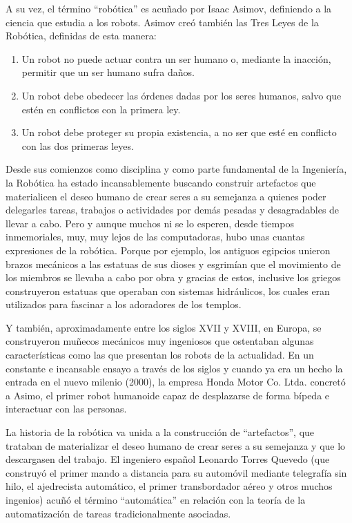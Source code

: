 A su vez, el término ``robótica'' es acuñado por Isaac Asimov, definiendo a la ciencia que estudia a los robots. Asimov creó también las Tres Leyes de la Robótica, definidas de esta manera:

\begin{enumerate}
	\itemsep1pt \parskip1pt 
	\item Un robot no puede actuar contra un ser humano o, mediante la inacción, permitir que un ser humano sufra daños.
	\item Un robot debe obedecer las órdenes dadas por los seres humanos, salvo que estén en conflictos con la primera ley.
	\item Un robot debe proteger su propia existencia, a no ser que esté en conflicto con las dos primeras leyes.
\end{enumerate}

Desde sus comienzos como disciplina y como parte fundamental de la Ingeniería, la Robótica ha estado incansablemente buscando construir artefactos que materialicen el deseo humano de crear seres a su semejanza a quienes poder delegarles tareas, trabajos o actividades por demás pesadas y desagradables de llevar a cabo. Pero y aunque muchos ni se lo esperen, desde tiempos inmemoriales, muy, muy lejos de las computadoras, hubo unas cuantas expresiones de la robótica. Porque por ejemplo, los antiguos egipcios unieron brazos mecánicos a las estatuas de sus dioses y esgrimían que el movimiento de los miembros se llevaba a cabo por obra y gracias de estos, inclusive los griegos construyeron estatuas que operaban con sistemas hidráulicos, los cuales eran utilizados para fascinar a los adoradores de los templos.

Y también, aproximadamente entre los siglos XVII y XVIII, en Europa, se construyeron muñecos mecánicos muy ingeniosos que ostentaban algunas características como las que presentan los robots de la actualidad. En un constante e incansable ensayo a través de los siglos y cuando ya era un hecho la entrada en el nuevo milenio (2000), la empresa Honda Motor Co. Ltda. concretó a Asimo, el primer robot humanoide capaz de desplazarse de forma bípeda e interactuar con las personas.

La historia de la robótica va unida a la construcción de ``artefactos'', que trataban de materializar el deseo humano de crear seres a su semejanza y que lo descargasen del trabajo. El ingeniero español Leonardo Torres Quevedo (que construyó el primer mando a distancia para su automóvil mediante telegrafía sin hilo, el ajedrecista automático, el primer transbordador aéreo y otros muchos ingenios) acuñó el término ``automática'' en relación con la teoría de la automatización de tareas tradicionalmente asociadas.

